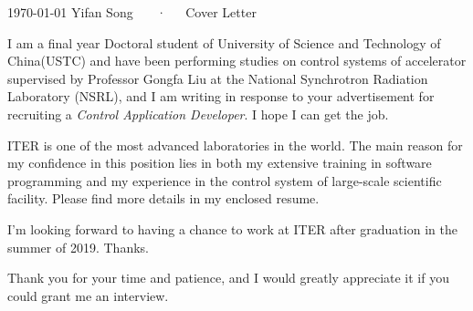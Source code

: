 \documentclass[11pt, a4paper]{awesome-cv}
\begin{document}
\makecvheader[R]

\makecvfooter
  {\today}
  {Yifan Song ~~~·~~~Cover Letter}
  {}

\makelettertitle

\begin{cvletter}

I am a final year Doctoral student of University of Science and Technology of China(USTC) and have been performing studies on control systems of accelerator supervised by Professor Gongfa Liu at the National Synchrotron Radiation Laboratory (NSRL), and I am writing in response to your advertisement for recruiting a \textit{Control Application Developer}. I hope I can get the job.

ITER is one of the most advanced  laboratories in the world. 
The main reason for my confidence in this position lies in both my extensive training in software programming and my experience in the control system of large-scale scientific facility. Please find more details in my enclosed resume.

I'm looking forward to having a chance to work at ITER after graduation in the summer of 2019. Thanks.

Thank you for your time and patience, and I would greatly appreciate it if you could grant me an interview.

\end{cvletter}


\makeletterclosing
\end{document}
